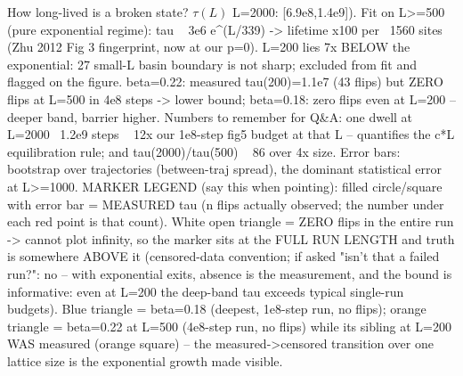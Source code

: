 \documentclass[aspectratio=169,10pt]{beamer}
\begin{document}
\begin{frame}{How long-lived is a broken state? $\tau(L)$}
{    L=2000: [6.9e8,1.4e9]). Fit on L>=500 (pure exponential regime):
    tau ~ 3e6 e^(L/339) -> lifetime x100 per ~1560 sites (Zhu 2012 Fig 3
    fingerprint, now at our p=0). L=200 lies 7x BELOW the exponential:
    27%
    small-L basin boundary is not sharp; excluded from fit and flagged on
    the figure. beta=0.22: measured tau(200)=1.1e7 (43 flips) but ZERO
    flips at L=500 in 4e8 steps -> lower bound; beta=0.18: zero flips even
    at L=200 -- deeper band, barrier higher. Numbers to remember for Q&A:
    one dwell at L=2000 ~1.2e9 steps ~ 12x our 1e8-step fig5 budget at that
    L -- quantifies the c*L equilibration rule; and tau(2000)/tau(500) ~ 86
    over 4x size. Error bars: bootstrap over trajectories (between-traj
    spread), the dominant statistical error at L>=1000.
    MARKER LEGEND (say this when pointing): filled circle/square with error
    bar = MEASURED tau (n flips actually observed; the number under each red
    point is that count). White open triangle = ZERO flips in the entire run
    -> cannot plot infinity, so the marker sits at the FULL RUN LENGTH and
    truth is somewhere ABOVE it (censored-data convention; if asked "isn't
    that a failed run?": no -- with exponential exits, absence is the
    measurement, and the bound is informative: even at L=200 the deep-band
    tau exceeds typical single-run budgets). Blue triangle = beta=0.18
    (deepest, 1e8-step run, no flips); orange triangle = beta=0.22 at
    L=500 (4e8-step run, no flips) while its sibling at L=200 WAS measured
    (orange square) -- the measured->censored transition over one lattice
    size is the exponential growth made visible.}
\end{frame}

\end{document}

